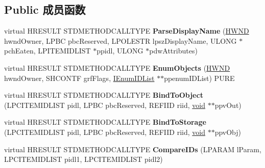 \subsection*{Public 成员函数}
\begin{DoxyCompactItemize}
\item 
\mbox{\label{class_c_common_folder_a881834b65a15599a9b5f5872929c42cb}} 
virtual H\+R\+E\+S\+U\+LT S\+T\+D\+M\+E\+T\+H\+O\+D\+C\+A\+L\+L\+T\+Y\+PE {\bfseries Parse\+Display\+Name} (\hyperlink{interfacevoid}{H\+W\+ND} hwnd\+Owner, L\+P\+BC pbc\+Reserved, L\+P\+O\+L\+E\+S\+TR lpsz\+Display\+Name, U\+L\+O\+NG $\ast$pch\+Eaten, L\+P\+I\+T\+E\+M\+I\+D\+L\+I\+ST $\ast$ppidl, U\+L\+O\+NG $\ast$pdw\+Attributes)
\item 
\mbox{\label{class_c_common_folder_a4e7c731ad91fb9e698827cddf40cf0c7}} 
virtual H\+R\+E\+S\+U\+LT S\+T\+D\+M\+E\+T\+H\+O\+D\+C\+A\+L\+L\+T\+Y\+PE {\bfseries Enum\+Objects} (\hyperlink{interfacevoid}{H\+W\+ND} hwnd\+Owner, S\+H\+C\+O\+N\+TF grf\+Flags, \hyperlink{interface_i_enum_i_d_list}{I\+Enum\+I\+D\+List} $\ast$$\ast$ppenum\+I\+D\+List) P\+U\+RE
\item 
\mbox{\label{class_c_common_folder_a0ff022705dc396a1bbaf384698573429}} 
virtual H\+R\+E\+S\+U\+LT S\+T\+D\+M\+E\+T\+H\+O\+D\+C\+A\+L\+L\+T\+Y\+PE {\bfseries Bind\+To\+Object} (L\+P\+C\+I\+T\+E\+M\+I\+D\+L\+I\+ST pidl, L\+P\+BC pbc\+Reserved, R\+E\+F\+I\+ID riid, \hyperlink{interfacevoid}{void} $\ast$$\ast$ppv\+Out)
\item 
\mbox{\label{class_c_common_folder_a877dd69b2f04c61419277fb7ccc2ed1e}} 
virtual H\+R\+E\+S\+U\+LT S\+T\+D\+M\+E\+T\+H\+O\+D\+C\+A\+L\+L\+T\+Y\+PE {\bfseries Bind\+To\+Storage} (L\+P\+C\+I\+T\+E\+M\+I\+D\+L\+I\+ST pidl, L\+P\+BC pbc\+Reserved, R\+E\+F\+I\+ID riid, \hyperlink{interfacevoid}{void} $\ast$$\ast$ppv\+Obj)
\item 
\mbox{\label{class_c_common_folder_a3fbd706f831eaf40a4db2891635e2d0b}} 
virtual H\+R\+E\+S\+U\+LT S\+T\+D\+M\+E\+T\+H\+O\+D\+C\+A\+L\+L\+T\+Y\+PE {\bfseries Compare\+I\+Ds} (L\+P\+A\+R\+AM l\+Param, L\+P\+C\+I\+T\+E\+M\+I\+D\+L\+I\+ST pidl1, L\+P\+C\+I\+T\+E\+M\+I\+D\+L\+I\+ST pidl2)
\item 
\mbox{\label{class_c_common_folder_ad4b2e953bb512b1d63559d29838e508b}} 
$$
\end{DoxyCompactItemize}
